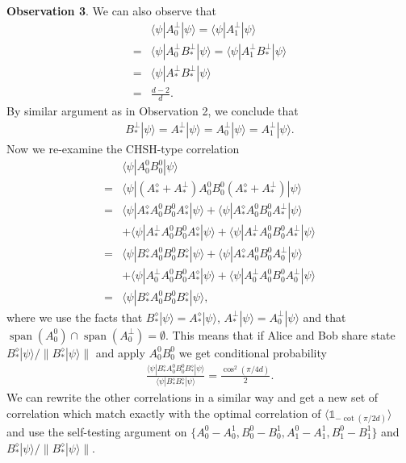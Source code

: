 \documentclass[11pt,letterpaper]{article}
\newcommand{\ket}[1]{|#1\rangle}
\newcommand{\bra}[1]{\langle#1|}
\DeclareMathOperator{\spn}{span}
\newcommand{\1}{\mathbb{1}}
\theoremstyle{definition}
\begin{document}
\textbf{Observation 3}. We can also observe that
\begin{align}
	&\bra{\psi}A_0^\perp\ket{\psi} = \bra{\psi}A_1^\perp\ket{\psi} \\
	= &\bra{\psi}A_0^\perp B_\ast^\perp\ket{\psi} = \bra{\psi}A_1^\perp B_\ast^\perp\ket{\psi} \\
	=& \bra{\psi} A_\ast^\perp B_\ast^\perp \ket{\psi}\\
	=& \frac{d-2}{d}.
\end{align}
By similar argument as in Observation 2, we conclude that 
\begin{align}
	B_\ast^\perp \ket{\psi} = A_\ast^\perp \ket{\psi} = A_0^\perp \ket{\psi} = A_1^\perp \ket{\psi}.
\end{align}
Now we re-examine the CHSH-type correlation
\begin{align}
	   &\bra{\psi} A_0^0B_0^0 \ket{\psi} \\
	= &\bra{\psi}(A_\ast^\diamond + A_\ast^\perp) A_0^0B_0^0 (A_\ast^\diamond + A_\ast^\perp)\ket{\psi} \\
	= & \bra{\psi}A_\ast^\diamond A_0^0B_0^0 A_\ast^\diamond\ket{\psi} + \bra{\psi}A_\ast^\diamond A_0^0B_0^0 A_\ast^\perp\ket{\psi} \\
	&+\bra{\psi}A_\ast^\perp A_0^0B_0^0 A_\ast^\diamond\ket{\psi} + \bra{\psi}A_\ast^\perp A_0^0B_0^0 A_\ast^\perp\ket{\psi}\\
	= & \bra{\psi}B_\ast^\diamond A_0^0B_0^0 B_\ast^\diamond\ket{\psi} + \bra{\psi}A_\ast^\diamond A_0^0B_0^0 A_0^\perp\ket{\psi} \\
	&+\bra{\psi}A_0^\perp A_0^0B_0^0 A_\ast^\diamond\ket{\psi} + \bra{\psi}A_0^\perp A_0^0B_0^0 A_0^\perp\ket{\psi}\\
	=&\bra{\psi}B_\ast^\diamond A_0^0B_0^0 B_\ast^\diamond\ket{\psi},
\end{align}
where we use the facts that $B_\ast^\diamond \ket{\psi} = A_\ast^\diamond \ket{\psi}$, $A_\ast^\perp \ket{\psi} = A_0^\perp \ket{\psi}$ and that 
$\spn(A_0^0) \cap \spn(A_0^\perp) = \emptyset$. This means that if Alice and Bob share state $B_\ast^\diamond \ket{\psi}/\|B_\ast^\diamond \ket{\psi}\|$ and apply $A_0^0B_0^0$
we get conditional probability
\begin{align}
	\frac{\bra{\psi}B_\ast^\diamond A_0^0B_0^0 B_\ast^\diamond\ket{\psi}}{\bra{\psi} B_\ast^\diamond B_\ast^\diamond \ket{\psi}} = \frac{\cos^2(\pi/4d)}{2}.
\end{align} 
We can rewrite the other correlations in a similar way and get a new set of correlation which match exactly with the optimal correlation of $\langle \1_{-\cot(\pi/2d)}\rangle$ and use the self-testing argument on $\{A_0^0-A_0^1, B_0^0-B_0^1, A_1^0-A_1^1, B_1^0-B_1^1\}$ and $B_\ast^\diamond \ket{\psi}/\|B_\ast^\diamond \ket{\psi}\|$.
\end{document}
